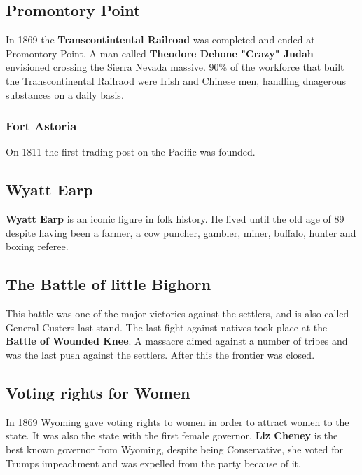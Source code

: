 \documentclass{article}
\begin{document}
	\subsection{Promontory Point}
	In 1869 the \textbf{Transcontintental Railroad} was completed and ended at Promontory Point. A man called \textbf{Theodore Dehone "Crazy" Judah} envisioned crossing the Sierra Nevada massive. 90\% of the workforce that built the Transcontinental Railraod were Irish and Chinese men, handling dnagerous substances on a daily basis. \\
	\subsubsection{Fort Astoria}
	On 1811 the first trading post on the Pacific was founded.
	\subsection{Wyatt Earp}
	\textbf{Wyatt Earp} is an iconic figure in folk history. He lived until the old age of 89 despite having been a farmer, a cow puncher, gambler, miner, buffalo, hunter and boxing referee.\\
	\subsection{The Battle of little Bighorn}
	This battle was one of the major victories against the settlers, and is also called General Custers last stand.
	The last fight against natives took place at the \textbf{Battle of Wounded Knee}. A massacre aimed against a number of tribes and was the last push against the settlers. After this the frontier was closed. \\
	\subsection{Voting rights for Women}
	In 1869 Wyoming gave voting rights to women in order to attract women to the state. It was also the state with the first female governor. \textbf{Liz Cheney} is the best known governor from Wyoming, despite being Conservative, she voted for Trumps impeachment and was expelled from the party because of it.
\end{document}
